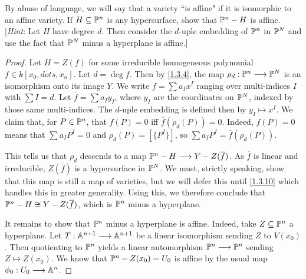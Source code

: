 \label{1.3.5}

By abuse of language, we will say that a variety ``is affine" if it is isomorphic to an affine variety. If $H \subseteq \P^n$ is any hypersurface, show that $\P^n - H$ is affine. [\emph{Hint}: Let $H$ have degree $d$. Then consider the $d$-uple embedding of $\P^n$ in $\P^N$ and use the fact that $\P^N$ minus a hyperplane is affine.]

\begin{proof}
    Let $H = Z(f)$ for some irreducible homogeneous polynomial $f \in k[x_0, dots, x_n]$. Let $d = \deg f$. Then by \ref{1.3.4}, the map $\rho_d: \P^n \longrightarrow \P^N$ is an isomorphism onto its image $Y$. We write $f = \sum a_I x^I$ ranging over multi-indices $I$ with $\sum I = d$. Let $\overline{f} = \sum a_I y_I$, where $y_I$ are the coordinates on $\P^N$, indexed by those same multi-indices. The $d$-uple embedding is defined then by $y_I \mapsto x^I$. We claim that, for $P \in \P^n$, that $f(P) = 0$ iff $\overline{f}(\rho_d(P)) = 0$. Indeed, $f(P) = 0$ means that $\sum a_I P^I = 0$ and $\rho_d(P) = [\{P^I\}]$, so $\sum a_I P^I = \overline{f}(\rho_d(P))$.

    This tells us that $\rho_d$ descends to a map $\P^n - H \longrightarrow Y - Z(\overline{f})$. As $\overline{f}$ is linear and irreducible, $Z(\overline{f})$ is a hypersurface in $\P^N$. We must, strictly speaking, show that this map is still a map of varieties, but we will defer this until \ref{1.3.10} which handles this in greater generality. Using this, we therefore conclude that $\P^n - H \cong Y - Z(\overline{f})$, which is $\P^n$ minus a hyperplane.

    It remains to show that $\P^n$ minus a hyperplane is affine. Indeed, take $Z \subseteq \P^n$ a hyperplane. Let $T: \A^{n + 1} \longrightarrow \A^{n + 1}$ be a linear isomorphism sending $Z$ to $V(x_0)$. Then quotienting to $\P^n$ yields a linear automorphism $\P^n \longrightarrow \P^n$ sending $Z \mapsto Z(x_0)$. We know that $\P^n - Z(x_0) = U_0$ is affine by the usual map $\phi_0: U_0 \longrightarrow \A^n$.
\end{proof}
